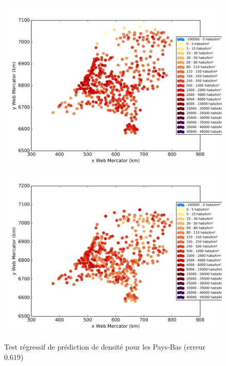 \documentclass{book}
\begin{document}
\begin{figure}[H]
\begin{center}
\includegraphics[scale=0.5]{images/pays-bas_ground_truth.png}
\includegraphics[scale=0.5]{images/pays-bas_Random_Forest_Regression.png}
\end{center}
\caption{Test régressif de prédiction de densité pour les Pays-Bas (erreur $0.619$)}
\label{test_pays-bas}
\end{figure}
\end{document}
